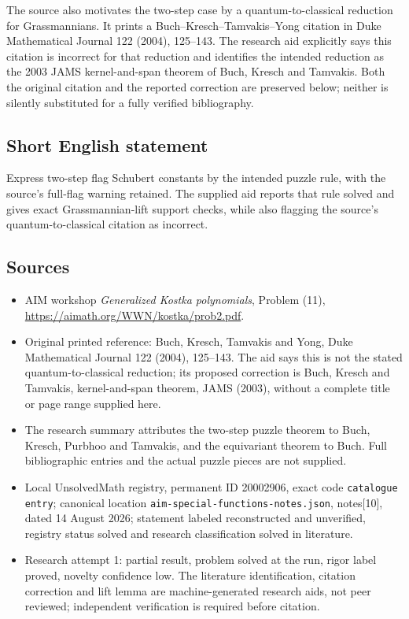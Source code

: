 \documentclass[11pt]{article}
\begin{document}
The source also motivates the two-step case by a quantum-to-classical reduction for Grassmannians. It prints a Buch--Kresch--Tamvakis--Yong citation in Duke Mathematical Journal 122 (2004), 125--143. The research aid explicitly says this citation is incorrect for that reduction and identifies the intended reduction as the 2003 JAMS kernel-and-span theorem of Buch, Kresch and Tamvakis. Both the original citation and the reported correction are preserved below; neither is silently substituted for a fully verified bibliography.
\subsection{Short English statement}
Express two-step flag Schubert constants by the intended puzzle rule, with the source's full-flag warning retained. The supplied aid reports that rule solved and gives exact Grassmannian-lift support checks, while also flagging the source's quantum-to-classical citation as incorrect.
\subsection{Sources}
\begin{itemize}
\item AIM workshop \emph{Generalized Kostka polynomials}, Problem (11), \url{https://aimath.org/WWN/kostka/prob2.pdf}.
\item Original printed reference: Buch, Kresch, Tamvakis and Yong, Duke Mathematical Journal 122 (2004), 125--143. The aid says this is not the stated quantum-to-classical reduction; its proposed correction is Buch, Kresch and Tamvakis, kernel-and-span theorem, JAMS (2003), without a complete title or page range supplied here.
\item The research summary attributes the two-step puzzle theorem to Buch, Kresch, Purbhoo and Tamvakis, and the equivariant theorem to Buch. Full bibliographic entries and the actual puzzle pieces are not supplied.
\item Local UnsolvedMath registry, permanent ID 20002906, exact code \texttt{catalogue entry}; canonical location \texttt{aim-special-functions-notes.json}, notes[10], dated 14 August 2026; statement labeled reconstructed and unverified, registry status solved and research classification solved in literature.
\item Research attempt 1: partial result, problem solved at the run, rigor label proved, novelty confidence low. The literature identification, citation correction and lift lemma are machine-generated research aids, not peer reviewed; independent verification is required before citation.
\end{itemize}
\end{document}

